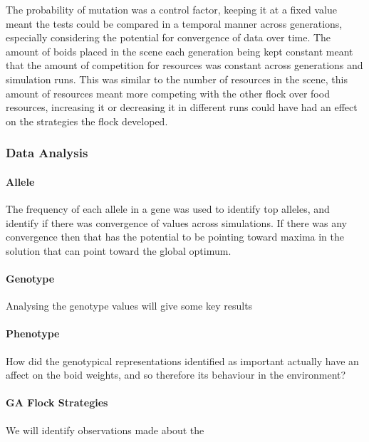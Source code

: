 The probability of mutation was a control factor, keeping it at a fixed value meant the tests could be compared in a temporal manner across generations, especially considering the potential for convergence of data over time. The amount of boids placed in the scene each generation being kept constant meant that the amount of competition for resources was constant across generations and simulation runs. This was similar to the number of resources in the scene, this amount of resources meant more competing with the other flock over food resources, increasing it or decreasing it in different runs could have had an effect on the strategies the flock developed.

\subsubsection{Data Analysis}
\paragraph{Allele}
The frequency of each allele in a gene was used to identify top alleles, and identify if there was convergence of values across simulations. If there was any convergence then that has the potential to be pointing toward maxima in the solution that can point toward the global optimum. 

\paragraph{Genotype}
Analysing the genotype values will give some key results

\paragraph{Phenotype}
How did the genotypical representations identified as important actually have an affect on the boid weights, and so therefore its behaviour in the environment?

\paragraph{GA Flock Strategies}
We will identify observations made about the 


















